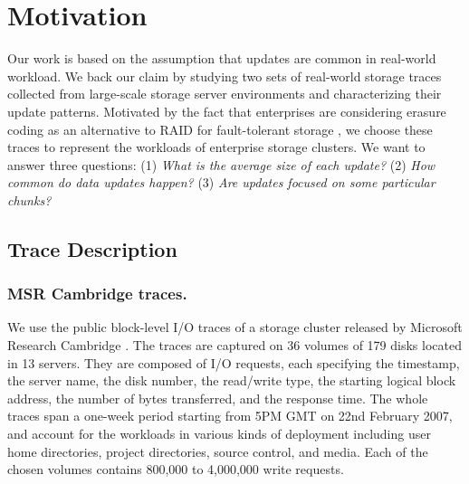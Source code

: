 \chapter{Motivation} 
\label{chap:motivation}
\label{sec:trace}

Our work is based on the assumption that updates are common in real-world workload. We
back our claim by studying two sets of real-world storage traces collected from
large-scale storage server environments and characterizing their update
patterns.  Motivated by the fact that enterprises are considering erasure coding
as an alternative to RAID for fault-tolerant storage \cite{raid_alternatives},
we choose these traces to represent the workloads of enterprise storage
clusters.  We want to answer three questions: (1) \textit{What is the average
    size of each update?} (2) \textit{How common do data updates happen?} (3)
\textit{Are updates focused on some particular chunks?}  


\section{Trace Description}

\subsection{MSR Cambridge traces.} We use the public block-level
I/O traces of a storage cluster released by Microsoft Research Cambridge
\cite{narayanan08}. The traces are captured %
on 36 volumes of 179 disks located in 13 servers.  They are composed
of I/O requests, each specifying the timestamp, the server name, the disk
number, the read/write type, the starting logical block address, 
the number of bytes transferred, and the response time.  The whole
traces span a one-week period starting from 5PM GMT on 22nd February 2007, and
account for the workloads in various kinds of deployment including user home
directories, project directories, source control, and media.  
Each of the chosen volumes contains 800,000 to 4,000,000 write requests. 


